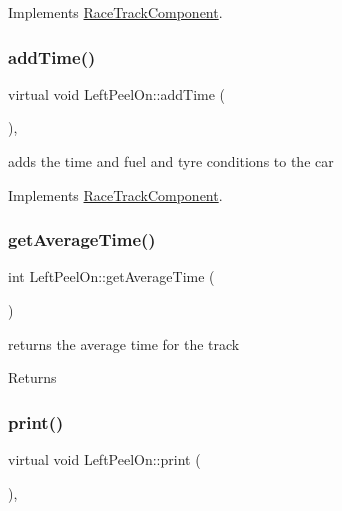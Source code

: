 Implements \mbox{\hyperlink{class_race_track_component_af89a6b453dfd3fb39fce27576012106f}{Race\+Track\+Component}}.

\mbox{\label{class_left_peel_on_a4be64feefcd629c6dcb765175a9ea007}} 
\subsubsection{\texorpdfstring{add\+Time()}{addTime()}}
{\footnotesize\ttfamily virtual void Left\+Peel\+On\+::add\+Time (\begin{DoxyParamCaption}{ }\end{DoxyParamCaption})\hspace{0.3cm}{\ttfamily [inline]}, {\ttfamily [virtual]}}

adds the time and fuel and tyre conditions to the car 

Implements \mbox{\hyperlink{class_race_track_component_aa815404c45ba7df3786c3add177eb7e6}{Race\+Track\+Component}}.

\mbox{\label{class_left_peel_on_adf01c9c255273eac71fc71b05e29d789}} 
\subsubsection{\texorpdfstring{get\+Average\+Time()}{getAverageTime()}}
{\footnotesize\ttfamily int Left\+Peel\+On\+::get\+Average\+Time (\begin{DoxyParamCaption}{ }\end{DoxyParamCaption})\hspace{0.3cm}{\ttfamily [inline]}}

returns the average time for the track \begin{DoxyReturn}{Returns}

\end{DoxyReturn}
\mbox{\label{class_left_peel_on_a929012f0508e2207ae4c8229aecece54}} 
\subsubsection{\texorpdfstring{print()}{print()}}
{\footnotesize\ttfamily virtual void Left\+Peel\+On\+::print (\begin{DoxyParamCaption}{ }\end{DoxyParamCaption})\hspace{0.3cm}{\ttfamily [inline]}, {\ttfamily [virtual]}}

